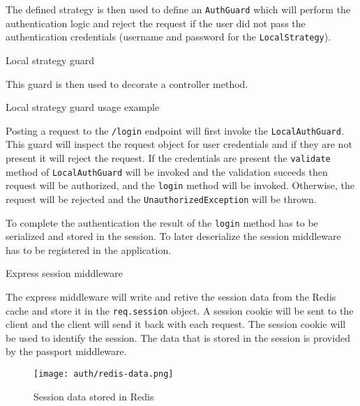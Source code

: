 \documentclass[../main.tex]{subfiles}
\begin{document}
The defined strategy is then used to define an \texttt{AuthGuard} which will perform the authentication logic and reject the request if the user
did not pass the authentication credentials (username and password for the \texttt{LocalStrategy}).

\begin{listing}[H]
  \caption{Local strategy guard}
\end{listing}

This guard is then used to decorate a controller method.

\begin{listing}[H]
  \caption{Local strategy guard usage example}
  \label{code:local-guard-usage}
\end{listing}

Posting a request to the \texttt{/login} endpoint will first invoke the \texttt{LocalAuthGuard}.
This guard will inspect the request object for user credentials and if they are not present it will reject the request.
If the credentials are present the \texttt{validate} method of \texttt{LocalAuthGuard} will be invoked and the validation suceeds then request will be authorized, and the
\texttt{login} method will be invoked. Otherwise, the request will be rejected and the \texttt{UnauthorizedException} will be thrown.

To complete the authentication the result of the \texttt{login} method has to be serialized and stored in the session.
To later deserialize the session middleware has to be registered in the application.

\begin{listing}[H]
  \caption{Express session middleware}
\end{listing}

The express middleware will write and retive the session data from the Redis cache and store it in the \texttt{req.session} object.
A session cookie will be sent to the client and the client will send it back with each request. The session cookie will be used to identify the session.
The data that is stored in the session is provided by the passport middleware.

\begin{figure}[H]
  \centering
  \texttt{[image: auth/redis-data.png]}
  \caption{Session data stored in Redis}
\end{figure}
\end{document}
